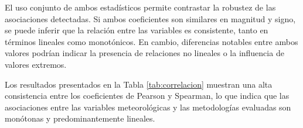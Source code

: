 El uso conjunto de ambos estadísticos permite contrastar la robustez de las asociaciones detectadas. Si ambos coeficientes son similares en magnitud y signo, se puede inferir que la relación entre las variables es consistente, tanto en términos lineales como monotónicos. En cambio, diferencias notables entre ambos valores podrían indicar la presencia de relaciones no lineales o la influencia de valores extremos.\\


\begin{table}[h]
\caption[Coeficientes de correlación de Pearson y Spearman entre las variables meteorológicas y GHI medida.]{Coeficientes de correlación de Pearson y Spearman entre las variables meteorológicas y GHI medida.}
\label{tab:correlacion}
\centering
{}
\end{table}



Los resultados presentados en la Tabla \ref{tab:correlacion} muestran una alta consistencia entre los coeficientes de Pearson y Spearman, lo que indica que las asociaciones entre las variables meteorológicas y las metodologías evaluadas son monótonas y predominantemente lineales.

